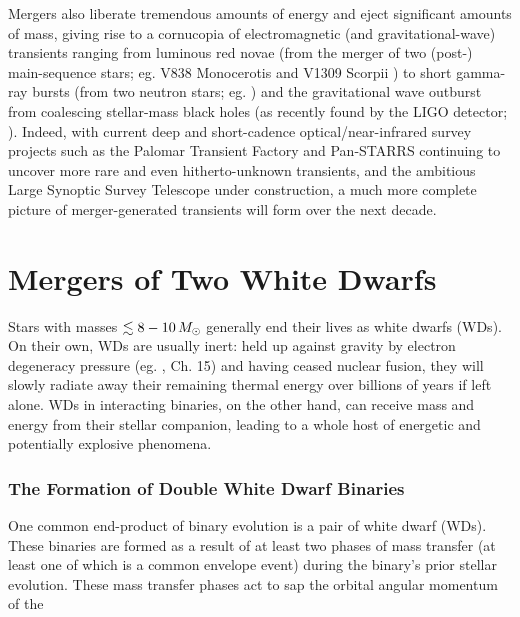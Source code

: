 Mergers also liberate tremendous amounts of energy and eject significant amounts of mass, giving rise to a cornucopia of electromagnetic (and gravitational-wave) transients ranging from luminous red novae (from the merger of two (post-) main-sequence stars; eg. V838 Monocerotis and V1309 Scorpii \citep{tyle+11, nandil14}) to short gamma-ray bursts (from two neutron stars; eg. \citealt{ross15}) and the gravitational wave outburst from coalescing stellar-mass black holes (as recently found by the LIGO detector; \citealt{ligo16}).  Indeed, with current deep and short-cadence optical/near-infrared survey projects such as the Palomar Transient Factory \citep{rau+09} and Pan-STARRS \citep{kais+10} continuing to uncover more rare and even hitherto-unknown transients, and the ambitious Large Synoptic Survey Telescope \citep{lsst09} under construction, a much more complete picture of merger-generated transients will form over the next decade.


\section{Mergers of Two White Dwarfs}
\label{sec:c1_wdmergers}

Stars with masses $\lesssim8-10\,\Msun$ generally end their lives as white dwarfs (WDs).  On their own, WDs are usually inert: held up against gravity by electron degeneracy pressure (eg. \cite{kippww12}, Ch. 15) and having ceased nuclear fusion, they will slowly radiate away their remaining thermal energy over billions of years if left alone.  WDs in interacting binaries, on the other hand, can receive mass and energy from their stellar companion, leading to a whole host of energetic and potentially explosive phenomena.

\subsubsection{The Formation of Double White Dwarf Binaries}

One common end-product of binary evolution is a pair of white dwarf (WDs).    These binaries are formed as a result of at least two phases of mass transfer (at least one of which is a common envelope event) during the binary's prior stellar evolution.  These mass transfer phases act to sap the orbital angular momentum of the 


